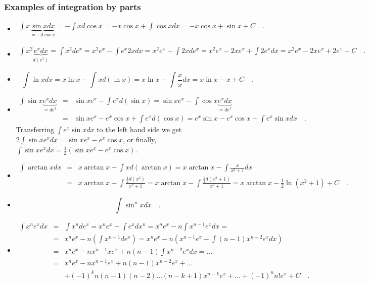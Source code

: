 \documentclass[12pt]{book}
\begin{document}
\subsubsection{Examples of integration by parts}
\begin{itemize}
\item
\[
\begin{array}{rcl}
\displaystyle\int x \underbrace{\sin x dx}_{=-d\cos x} = -\int x d\cos x = -x\cos x + \int \cos x dx = -x \cos x +\sin x +C\quad .
\end{array}
\]
\item 
\[
\begin{array}{rcl}
\displaystyle\int x^2 \underbrace{e^x dx}_{d (e^x)} = \int x^2 d e^x= x^2e^x - \int e^x2xdx=  x^2e^x - \int 2xd e^x = x^2e^x- 2xe^x+ \int 2e^x dx= x^2e^x-2xe^x+2e^x+C\quad .
\end{array}
\]
\item 
\[\int \ln x dx = x\ln x - \int x d(\ln x)= x\ln x -\int \frac{x}{x}dx= x\ln x-x+C\quad . 
\]
\item 
\[
\begin{array}{rcl}
\displaystyle\int \sin x \underbrace{e^x dx}_{=de^x}&=&\displaystyle\sin x e^x - \int e^xd(\sin x)=\sin x e^x - \int \cos x \underbrace{e^x dx}_{=de^x}\\
&=& \displaystyle\sin x e^x - e^x\cos x +\int e^x d(\cos x)= e^x\sin x -e^x\cos x-\int e^x\sin x dx\quad . 
\end{array}
\]
Transferring $\displaystyle\int e^x\sin x dx$ to the left hand side we get $\displaystyle 2\int \sin x e^x dx = \sin x e^x-e^x\cos x$, or finally, $\displaystyle \int \sin x e^x dx=\frac12 \left(\sin x e^x- e^x\cos x\right)$.
\item 
\[
\begin{array}{rcl}
\displaystyle\int \arctan x dx &=& x\displaystyle \arctan x - \int x d(\arctan x)= x\arctan x - \int \frac{x}{x^2+1}dx\\
&=& \displaystyle  x\arctan x - \int \frac{\frac{1}2d(x^2)}{x^2+1}=  x\arctan x - \int \frac{\frac{1}2d(x^2+1)}{x^2+1}= x\arctan x - \frac12\ln (x^2+1) +C\quad .
\end{array}
\]
\item 
\[\int \sin^n x dx\quad .
\]
\item 
\[
\begin{array}{rcl}
\displaystyle\int x^n e^x dx &=& \displaystyle\int x^n d e^x= x^n e^x- \int  e^x dx^n= x^n e^x- n\int  x^{n-1}e^x dx=\\
&=&\displaystyle x^ne^x- n\left(\int x^{n-1}de^x \right)= x^ne^x - n\left(x^{n-1}e^x- \int (n-1)x^{n-2}e^x dx\right)\\
&=&\displaystyle x^{n}e^x-nx^{n-1}xe^x+n(n-1)\int x^{n-2}e^x dx =\dots\\
&=&\displaystyle x^ne^{x}- nx^{n-1}e^x+n(n-1)x^{n-2}e^x+\dots \\
&&+(-1)^kn(n-1)(n-2)\dots(n-k+1)x^{n-k}e^x+\dots +(-1)^n n! e^x+C\quad .
\end{array}
\]

\end{itemize}
\end{document}
